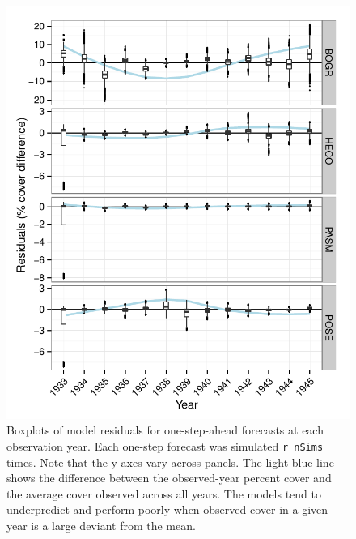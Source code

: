 \documentclass[12pt,]{article}
\begin{document}
\begin{figure}[htbp]
\centering
\includegraphics{components/figure/manuscript-figure_3.pdf}
\caption{Boxplots of model residuals for one-step-ahead forecasts at
each observation year. Each one-step forecast was simulated
\texttt{r nSims} times. Note that the y-axes vary across panels. The
light blue line shows the difference between the observed-year percent
cover and the average cover observed across all years. The models tend
to underpredict and perform poorly when observed cover in a given year
is a large deviant from the mean.}
\end{figure}
\end{document}
